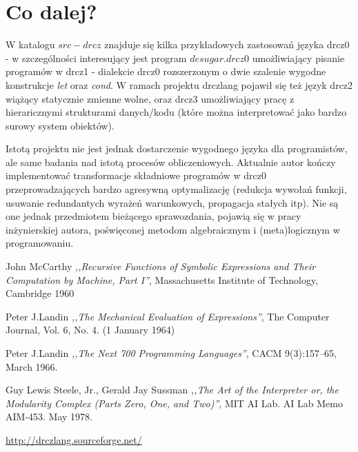 \documentclass[a4paper]{article}
\begin{document}
\section{Co dalej?}
W katalogu $src-drcz$ znajduje się kilka przykładowych zastosowań języka drcz0 - w szczególności
interesujący jest program $desugar.drcz0$ umożliwiający pisanie programów w drcz1 - dialekcie drcz0
rozszerzonym o dwie szalenie wygodne konstrukcje \emph{let} oraz \emph{cond}.
W ramach projektu drczlang pojawił się też język drcz2 wiążący statycznie zmienne wolne, oraz
drcz3 umożliwiający pracę z hieraricznymi strukturami danych/kodu (które można interpretować jako
bardzo surowy system obiektów).

Istotą projektu nie jest jednak dostarczenie wygodnego języka dla programistów, ale same badania
nad istotą procesów obliczeniowych. Aktualnie autor kończy implementować transformacje składniowe
programów w drcz0 przeprowadzających bardzo agresywną optymalizację (redukcja wywołań funkcji,
usuwanie redundantych wyrażeń warunkowych, propagacja stałych itp). Nie są one jednak przedmiotem
bieżącego sprawozdania, pojawią się w pracy inżynierskiej autora, poświęconej metodom algebraicznym
i (meta)logicznym w programowaniu.


\begin{thebibliography}{}
  John McCarthy \emph{,,Recursive Functions of Symbolic Expressions and Their Computation by Machine, Part I''}, Massachusetts Institute of Technology, Cambridge 1960

   Peter J.Landin \emph{,,The Mechanical Evaluation of Expressions''}, The Computer Journal, Vol. 6, No. 4. (1 January 1964)

  Peter J.Landin \emph{,,The Next 700 Programming Languages''}, CACM 9(3):157–65, March 1966.

  Guy Lewis Steele, Jr., Gerald Jay Sussman \emph{,,The Art of the Interpreter or, the Modularity Complex (Parts Zero, One, and Two)''}, MIT AI Lab. AI Lab Memo AIM-453. May 1978.

  \url{http://drczlang.sourceforge.net/}


\end{thebibliography}
\end{document}
